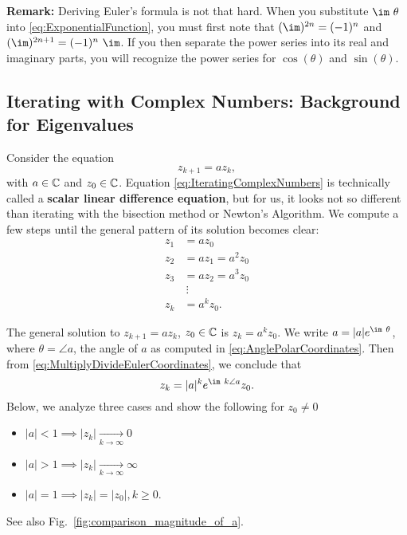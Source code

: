 \vspace*{2cm}

\textbf{Remark:} Deriving Euler's formula is not that hard. When you substitute $\im~\theta$
into \eqref{eq:ExponentialFunction}, you must first note that $(\im)^{2n}=(-1)^n$ and $(\im)^{2n+1}=(-1)^n ~\im$. If you then separate the power series into its real and imaginary parts, you will recognize the power series for $\cos(\theta)$ and $\sin(\theta)$.

\subsection{Iterating with Complex Numbers: Background for Eigenvalues}
\label{sec:IteratingComplexnumbers}

Consider the equation 
\begin{equation}
    \label{eq:IteratingComplexNumbers}
z_{k+1}= a z_k,
\end{equation}
with $a\in \mathbb C$ and $z_0 \in \mathbb C$. Equation \eqref{eq:IteratingComplexNumbers} is technically called a \textbf{scalar linear difference equation}, but for us, it looks not so different than iterating with the bisection method or Newton's Algorithm. We compute a few steps until the general pattern of its solution becomes clear:
\begin{equation}
    \label{eq:IteratingComplexNumbers02}
    \begin{aligned}
   z_1&= a z_0\\
   z_2& = a z_1 = a^2 z_0 \\
   z_3&= a z_2 = a^3 z_0\\
   &~\vdots \\
   z_k&=a^k z_0.
    \end{aligned}
\end{equation}

\vspace*{0.2cm}
\begin{tcolorbox}[title=\textbf{Scalar Linear Difference Equation}]
The general solution to $z_{k+1}= a z_k$, $z_0\in \mathbb C$ is $z_k = a^k z_0$. We write $a=|a|e^{\im~\theta}$, where $\theta = \angle a$, the angle of $a$ as computed in \eqref{eq:AnglePolarCoordinates}. Then from \eqref{eq:MultiplyDivideEulerCoordinates}, we conclude that
\begin{equation}
    \label{eq:IteratingComplexNumbers03 }
    z_k = |a|^k e^{\im~k \angle a}z_0.
\end{equation}
Below, we analyze three cases and show the following for $z_0 \neq 0$
\begin{itemize}
    \item $|a|<1 \implies |z_k| \underset{k \to \infty}{\longrightarrow} 0$
    \item $|a|>1 \implies |z_k| \underset{k \to \infty}{\longrightarrow} \infty$
 \item $|a|=1 \implies |z_k|=|z_0|, k \ge 0$.
\end{itemize}
See also Fig.~\ref{fig:comparison_magnitude_of_a}.
\end{tcolorbox}

